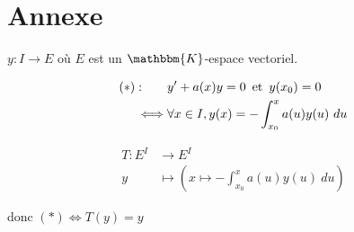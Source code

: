\part{Annexe}

$y: I \to E$ où $E$ est un $\mathbbm{K}$-espace vectoriel.

\begin{align*}
	(*) :\qquad &y' + a(x) y = 0 \operatorname{\text{ et }} y(x_0) = 0\\
	\iff& \forall x \in I, y(x) = -\int_{x_0}^{x} a(u) y(u)~du
\end{align*}

\begin{align*}
	T: E^I &\longrightarrow E^I \\
	y &\longmapsto \left( x \mapsto -\int_{x_0}^{x} a(u) y(u) ~du  \right) 
\end{align*}

donc $(*) \iff T(y) = y$
